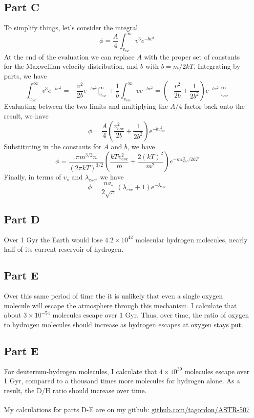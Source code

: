 \documentclass[a4paper, 11pt]{article}
\begin{document}
	\subsection*{Part C}
		To simplify things, let's consider the integral 
		\begin{equation*}
			\phi = \frac{A}{4}\int_{v_\text{esc}}^\infty v^3e^{-bv^2}
		\end{equation*}
		At the end of the evaluation we can replace $A$ with the proper set of constants for the Maxwellian velocity distribution, 
		and $b$ with $b = m/2kT$. Integrating by parts, we have
		\begin{equation*}
			\int_{v_{esc}}^\infty v^3e^{-bv^2} = -\frac{v^2}{2b}e^{-bv^2}\bigg|_{v_{esc}}^\infty + \frac{1}{b}\int_{v_{esc}}^\infty ve^{-bv^2} = \left(-\frac{v^2}{2b}+\frac{1}{2b^2}\right)e^{-bv^2}\bigg|_{v_{esc}}^\infty
		\end{equation*}
		Evaluating between the two limits and multiplying the $A/4$ factor back onto the result, we have
		\begin{equation*}
			\phi = \frac{A}{4} \left(\frac{v_{esc}^2}{2b} + \frac{1}{2b^2}\right)e^{-bv_{esc}^2}
		\end{equation*}
		Substituting in the constants for $A$ and $b$, we have
		\begin{equation*}
			\phi = \frac{\pi m^{3/2}n}{(2\pi kT)^{3/2}} \left(\frac{kTv_{esc}^2}{m} + \frac{2(kT)^2}{m^2}\right)e^{-mv_{esc}^2/2kT}
		\end{equation*}
		Finally, in terms of $v_s$ and $\lambda_{esc}$, we have
		\begin{equation*}
			\phi = \frac{nv_s}{2\sqrt{\pi}}(\lambda_{esc} + 1)e^{-\lambda_{esc}}
		\end{equation*}
	\subsection*{Part D}
		Over 1 Gyr the Earth would lose $4.2\times10^{42}$ molecular hydrogen molecules, nearly half of its current reservoir of 
		hydrogen. 
	\subsection*{Part E}
		Over this same period of time the it is unlikely that even a single oxygen molecule will escape the atmosphere through this 
		mechanism. I calculate that about $3\times10^{-54}$ molecules escape over 1 Gyr. Thus, over time, the ratio of oxygen to 
		hydrogen molecules should increase as hydrogen escapes at oxygen stays put.
	\subsection*{Part E}
		For deuterium-hydrogen molecules, I calculate that $4\times10^{39}$ molecules escape over 1 Gyr, compared to a thousand 
		times more molecules for hydrogen alone. As a result, the D/H ratio should increase over time. 
		\ \\ \\
		My calculations for parts D-E are on my github: \hyperref[http://github.com/tagordon/ASTR-507]{github.com/tagordon/ASTR-507}
	
	
\end{document}
